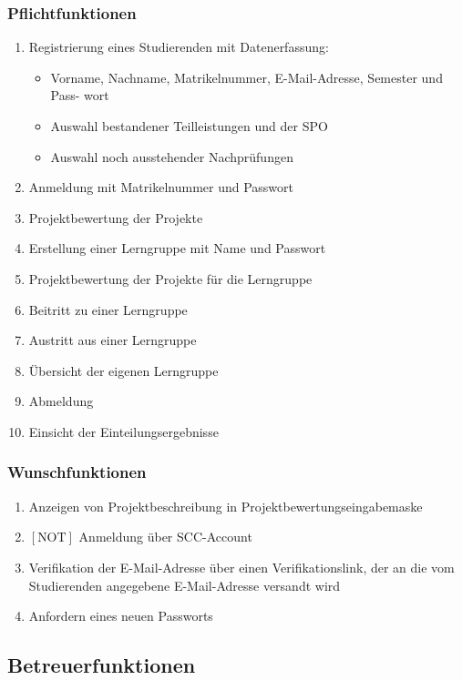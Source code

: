 \documentclass[parskip=full]{scrartcl}
\newcommand{\swtLabel}[1]{\textbf{/#1\arabic*0/}}
\begin{document}
\subsubsection{Pflichtfunktionen}
\begin{enumerate}[label=\swtLabel{FA}, resume]
  \item Registrierung eines Studierenden mit Datenerfassung:
  \begin{itemize}
    \item Vorname, Nachname, Matrikelnummer, E-Mail-Adresse, Semester und Pass-
wort
\item Auswahl bestandener Teilleistungen und der SPO
\item Auswahl noch ausstehender Nachprüfungen
  \end{itemize}
  \item Anmeldung mit Matrikelnummer und Passwort
  \item Projektbewertung der Projekte
  \item Erstellung einer Lerngruppe mit Name und Passwort
  \item Projektbewertung der Projekte für die Lerngruppe
  \item Beitritt zu einer Lerngruppe
  \item Austritt aus einer Lerngruppe
  \item Übersicht der eigenen Lerngruppe
  \item Abmeldung
  \item Einsicht der Einteilungsergebnisse
\end{enumerate}
\subsubsection{Wunschfunktionen}
\begin{enumerate}[label=\swtLabel{FA}, resume]
  \item Anzeigen von Projektbeschreibung in Projektbewertungseingabemaske
  \item $[\text{NOT}]$ Anmeldung über SCC-Account
  \item Verifikation der E-Mail-Adresse über einen Verifikationslink, der an die vom
Studierenden angegebene E-Mail-Adresse versandt wird
\item Anfordern eines neuen Passworts
\end{enumerate}

\subsection{Betreuerfunktionen}
\end{document}
